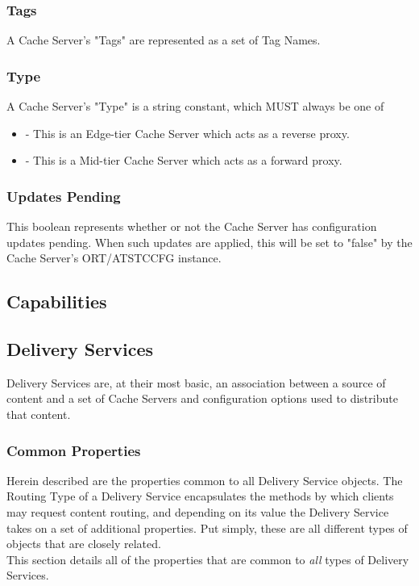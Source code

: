\subsubsection{Tags}
A Cache Server's "Tags" are represented as a set of Tag Names.

\subsubsection{Type}
A Cache Server's "Type" is a string constant, which MUST always be one of

\begin{itemize}
	\item {} - This is an Edge-tier Cache Server which acts as a
	reverse proxy.
	\item {} - This is a Mid-tier Cache Server which acts as a forward
	proxy.
\end{itemize}

\subsubsection{Updates Pending}
This boolean represents whether or not the Cache Server has configuration
updates pending. When such updates are applied, this will be set to "false" by
the Cache Server's ORT/ATSTCCFG instance.


\subsection{Capabilities}


\subsection{Delivery Services}
Delivery Services are, at their most basic, an association between a source of
content and a set of Cache Servers and configuration options used to distribute
that content.

\subsubsection{Common Properties}
Herein described are the properties common to all Delivery Service objects. The
Routing Type of a Delivery Service encapsulates the methods by which clients
may request content routing, and depending on its value the Delivery Service
takes on a set of additional properties. Put simply, these are all different
types of objects that are closely related.\\
This section details all of the properties that are common to \emph{all} types
of Delivery Services.


